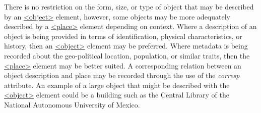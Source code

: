 There is no restriction on the form, size, or type of object that may be described by an \hyperref[TEI.object]{<object>} element, however, some objects may be more adequately described by a \hyperref[TEI.place]{<place>} element depending on context. Where a description of an object is being provided in terms of identification, physical characteristics, or history, then an \hyperref[TEI.object]{<object>} element may be preferred. Where metadata is being recorded about the geo-political location, population, or similar traits, then the \hyperref[TEI.place]{<place>} element may be better suited. A corresponding relation between an object description and place may be recorded through the use of the {\itshape corresp} attribute. An example of a large object that might be described with the \hyperref[TEI.object]{<object>} element could be a building such as the Central Library of the National Autonomous University of Mexico.\par
